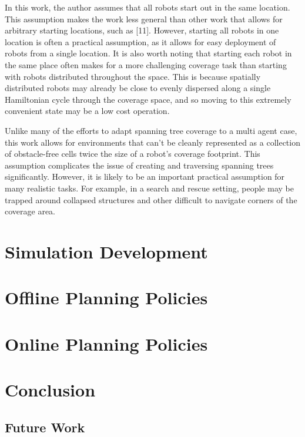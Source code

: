 \documentclass[letterpaper, 12pt, leqno]{report}
\begin{document}
In this work, the author assumes that all robots start out in the same location. This assumption makes the work less general than other work that allows for arbitrary starting locations, such as [11]. However, starting all robots in one location is often a practical assumption, as it allows for easy deployment of robots from a single location. It is also worth noting that starting each robot in the same place often makes for a more challenging coverage task than starting with robots distributed throughout the space. This is because spatially distributed robots may already be close to evenly dispersed along a single Hamiltonian cycle through the coverage space, and so moving to this extremely convenient state may be a low cost operation.

Unlike many of the efforts to adapt spanning tree coverage to a multi agent case, this work allows for environments that can't be cleanly represented as a collection of obstacle-free cells twice the size of a robot's coverage footprint. This assumption complicates the issue of creating and traversing spanning trees significantly. However, it is likely to be an important practical assumption for many realistic tasks. For example, in a search and rescue setting, people may be trapped around collapsed structures and other difficult to navigate corners of the coverage area. 


\chapter{Simulation Development}

\chapter{Offline Planning Policies}

\chapter{Online Planning Policies}

\chapter{Conclusion}

\section{Future Work}
\end{document}
